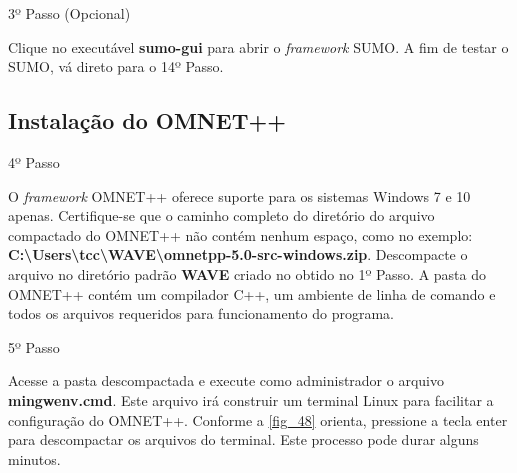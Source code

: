 \documentclass[
12pt,				%
openright,			%
oneside,			%
a4paper,			%
brazil,				%
]{abntex2}
\begin{document}
{\begin{anexosenv}
            	
            	    \begin{description}
		                \item[3º Passo (Opcional)]
		            \end{description}
		            \par Clique no executável \textbf{sumo-gui} para abrir o \textit{framework} SUMO. A fim de testar o SUMO, vá direto para o 14º Passo.

            	\subsection{Instalação do OMNET++}
            	
            	    \begin{description}
		                \item[4º Passo]
		            \end{description}
		            \par O \textit{framework} OMNET++ oferece suporte para os sistemas Windows 7 e 10 apenas. Certifique-se que o caminho completo do diretório do arquivo compactado do OMNET++ não contém nenhum espaço, como no exemplo: \textbf{C:\textbackslash Users\textbackslash tcc\textbackslash WAVE\textbackslash omnetpp-5.0-src-windows.zip}. Descompacte o arquivo no diretório padrão \textbf{WAVE} criado no obtido no 1º Passo. A pasta do OMNET++ contém um compilador C++, um ambiente de linha de comando e todos os arquivos requeridos para funcionamento do programa.
                    
            	
            	    \begin{description}
		                \item[5º Passo]
		            \end{description}
		            \par Acesse a pasta descompactada e execute como administrador o arquivo \textbf{mingwenv.cmd}. Este arquivo irá construir um terminal Linux para facilitar a configuração do OMNET++. Conforme a \autoref{fig_48} orienta, pressione a tecla enter para descompactar os arquivos do terminal. Este processo pode durar alguns minutos. %
		            

\end{anexosenv}}
\end{document}
